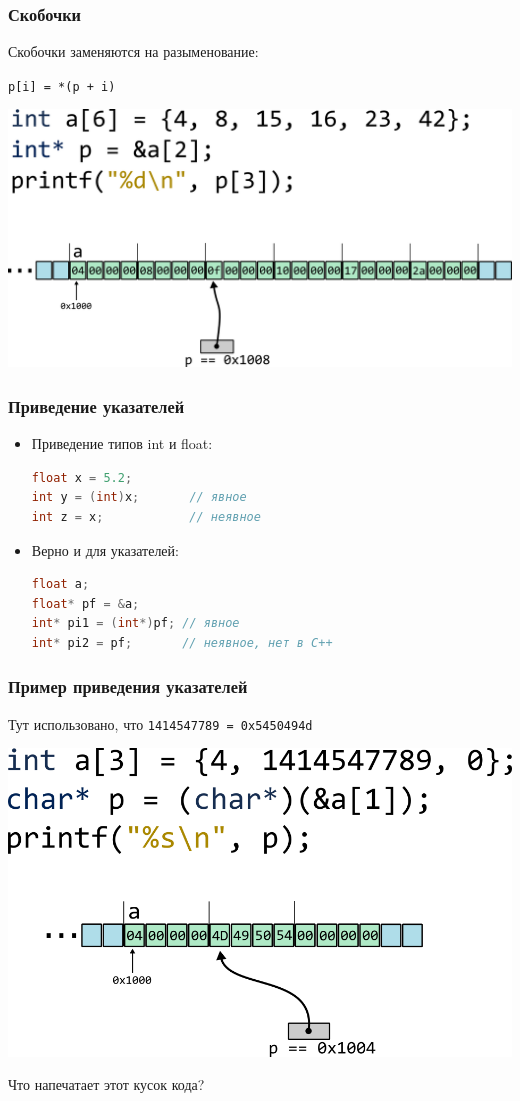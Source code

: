 \documentclass[10pt,pdf,hyperref={unicode}]{beamer}
\begin{document}
\begin{frame}[fragile]
\frametitle{Скобочки}
Скобочки заменяются на разыменование: 
\begin{center}
\texttt{p[i] = *(p + i)}
\end{center}
\begin{center}
\includegraphics[width=0.86\linewidth]{../images/pointer_arithmetics/parithmetics_6_brackets.png}
\end{center}
\end{frame}

\begin{frame}[fragile]
\frametitle{Приведение указателей} 
\begin{itemize}
\item Приведение типов int и float: \\
\begin{lstlisting}[language=C++,basicstyle=\ttfamily,keywordstyle=\color{blue}]
float x = 5.2;
int y = (int)x;       // явное
int z = x;            // неявное
\end{lstlisting}
\item Верно и для указателей: \\
\begin{lstlisting}[language=C++,basicstyle=\ttfamily,keywordstyle=\color{blue}]
float a;
float* pf = &a;
int* pi1 = (int*)pf; // явное
int* pi2 = pf;       // неявное, нет в C++
\end{lstlisting}
\end{itemize}
\end{frame}

\begin{frame}[fragile]
\frametitle{Пример приведения указателей}
Тут использовано, что \texttt{1414547789 = 0x5450494d}
\begin{center}
\includegraphics[width=0.86\linewidth]{../images/pointer_arithmetics/parithmetics_7_pointer_casting.png}
\end{center}
Что напечатает этот кусок кода?
\end{frame}
\end{document}
